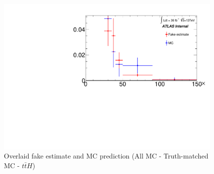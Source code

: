 \documentclass[11pt]{article}
\begin{document}
	\begin{figure}[H]
		\centering
		\includegraphics[width=0.7\linewidth]{figures/FakesEstimate_data_pp8_nonallhad_new_SubtractionFix_newOverlay/Overlay_FF_tau_pt_bkg.pdf}
		\caption{Overlaid fake estimate and MC prediction (All MC - Truth-matched MC - $t\bar{t}H$)}
	\end{figure}
\end{document}
